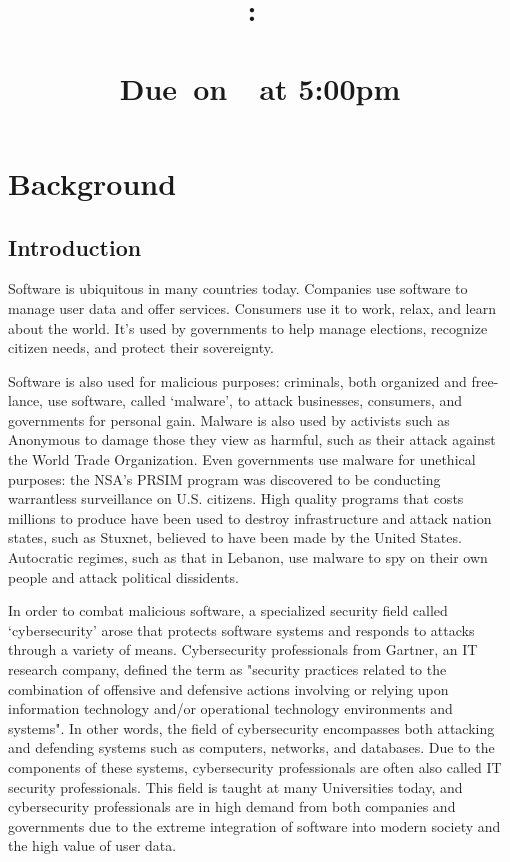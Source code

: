 \documentclass[openright]{report}
\title{
    \vspace{2in}
    \LARGE{\textbf{\projectTitle}}\\
    \vspace{0.1in}\large{\reportClass:\ \reportTopic}\\
    \vspace{0.1in}\large{\reportClassInstructor}\\
    \normalsize\vspace{0.1in}\large{Due\ on\ \reportDueDate\ at 5:00pm}
    \vspace{1.4in}
}
\author{\reportAuthorName}
\date{}
\begin{document}
\maketitle

\large{\tableofcontents}

\chapter{Background}

\section{Introduction}

\par Software is ubiquitous in many countries today. Companies use software to manage user data and offer services. Consumers use it to work, relax, and learn about the world. It's used by governments to help manage elections, recognize citizen needs, and protect their sovereignty. 

\par Software is also used for malicious purposes: criminals, both organized and free-lance, use software, called `malware', to attack businesses, consumers, and governments for personal gain. Malware is also used by activists such as Anonymous to damage those they view as harmful, such as their attack against the World Trade Organization\cite{anonymous_attack}. Even governments use malware for unethical purposes: the NSA's PRSIM program was discovered to be conducting warrantless surveillance on U.S. citizens\cite{nsa_illegal}. High quality programs that costs millions to produce have been used to destroy infrastructure and attack nation states, such as Stuxnet, believed to have been made by the United States\cite{stuxnet}. Autocratic regimes, such as that in Lebanon, use malware to spy on their own people and attack political dissidents\cite{lebanon}.

\par In order to combat malicious software, a specialized security field called `cybersecurity' arose that protects software systems and responds to attacks through a variety of means. Cybersecurity professionals from Gartner, an IT research company, defined the term as "security practices related to the combination of offensive and defensive actions involving or relying upon information technology and/or operational technology environments and systems"\cite{cyber_def}. In other words, the field of cybersecurity encompasses both attacking and defending systems such as computers, networks, and databases. Due to the components of these systems, cybersecurity professionals are often also called IT security professionals. This field is taught at many Universities today, and cybersecurity professionals are in high demand from both companies and governments due to the extreme integration of software into modern society and the high value of user data.
\end{document}
